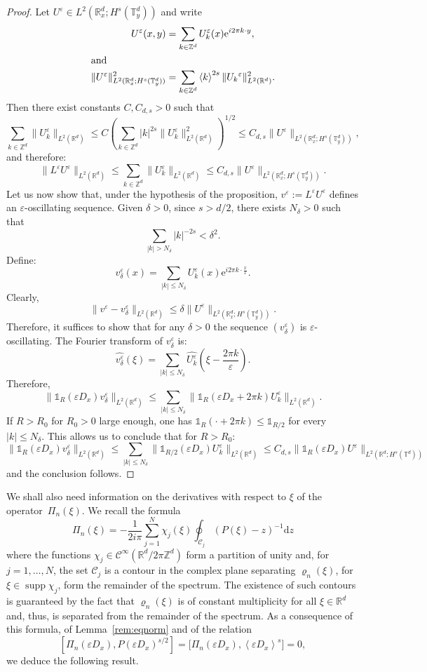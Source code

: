 \documentclass[AHL,Unicode,longabstracts]{cedram}
\DeclareMathOperator{\supp}{supp}
\newcommand*\R{{\mathbb R}}
\newcommand*\Z{{\mathbb Z}}
\newcommand*\T{{\mathbb T}}
\newcommand*\eps{\varepsilon}
\numberwithin{equation}{section}
\newcommand{\ee}{{\mathrm e}}
\newcommand*{\dd}{\mathrm{d}}
\begin{document}
\begin{proof}
Let $U^\eps \in L^2(\R^d_x;H^s(\T^d_y))$ and write
\begin{align*}
U^\eps(x,y)&=\sum_{k\in\Z^d}U_k^\eps(x){\ee}^{i2\pi k\cdot y},\\
\intertext{and}
\|U{^\eps}\|_{L^2(\R^d_x;H^s(\T^d_y))}^2 &=\sum_{k\in\Z^d}\left\langle k \right\rangle^{{2s}} \|U_k{^\eps}\|^2_{L^2(\R^d)}.
\end{align*}
Then there exist constants $C,C_{d,s}>0$ such that
\[
\sum_{k\in\Z^d}\|U_k^\eps\|_{L^2(\R^d)}\leq C\left(\sum_{k\in\Z^d}|k|^{2s} \|U_k^\eps\|_{L^2(\R^d)}^2\right)^{1/2} \leq C_{d,s} \|U^\eps\|_{L^2(\R^d_x;H^s(\T^d_y))},
\]
and therefore:
\begin{equation}\label{eq:bdVe}
\|L^\eps U^\eps\|_{L^2(\R^d)}\leq \sum_{k\in\Z^d}\|U_k^\eps\|_{L^2(\R^d)}\leq C_{d,s}\|U^\eps\|_{L^2(\R^d_x;H^s(\T^d_y))}.
\end{equation}
Let us now show that, under the hypothesis of the proposition, $v^\eps:=L^\eps U^\eps$ defines an $\eps$-oscillating sequence. Given $\delta>0$, since $s>d/2$, there exists $N_\delta>0$ such that
\[
\sum_{|k|>N_\delta}|k|^{-2s}<\delta^2.
\]
Define:
\[
v^\eps_\delta(x)=\sum_{|k|\leq N_\delta}U_k^\eps(x){\ee}^{i2\pi k\cdot \frac{x}{\eps}}.
\]
Clearly,
\[
\|v^\eps-v^\eps_\delta\|_{L^2(\R^d)}\leq \delta \|U^\eps\|_{L^2(\R^d_x;H^s(\T^d_y))}.
\]
Therefore, it suffices to show that for any $\delta>0$ the sequence $(v^\eps_\delta)$ is $\eps$-oscillating. The Fourier transform of $v^\eps_\delta$ is:
\[
\widehat{v^\eps_\delta}(\xi)=\sum_{|k|\leq N_\delta}\widehat{U_k^\eps}\left(\xi -\frac{2\pi k}{\eps}\right).
\]
Therefore,
\[
\|\mathds{1}_R(\eps D_x)v^\eps_{\delta}\|_{L^2(\R^d)}\leq \sum_{|k|\leq N_\delta}\|\mathds{1}_R(\eps D_x+2\pi k)U_k^\eps\|_{L^2(\R^d)}.
\]
If $R>R_0$ for $R_0>0$ large enough, one has $\mathds{1}_R(\cdot+2\pi k)\leq \mathds{1}_{R/2}$ for every $|k|\leq N_{\delta}$. This allows us to conclude that for $R>R_0$:
\[
\|\mathds{1}_R(\eps D_x)v^\eps_\delta\|_{L^2(\R^d)}\leq \sum_{|k|\leq N_\delta}\|\mathds{1}_{R/2}(\eps D_x)U_k^\eps\|_{L^2(\R^d)}\leq C_{d,s}\|\mathds{1}_R(\eps D_x)U^\eps\|_{L^2(\R^d;H^s(\T^d))}
\]
and the conclusion follows.
\end{proof}



We shall also need information on the derivatives with respect to $\xi$ of the operator~$\Pi_n(\xi)$. We recall the formula
\[
\Pi_n(\xi) =- \frac{1}{2i\pi} \sum_{j=1}^N\chi_j(\xi)\oint_{\mathcal C_j} (P(\xi)-z)^{-1} \dd z
\]
where the functions $\chi_j\in\mathcal{C}^\infty(\R^d/2\pi\Z^d)$ form a partition of unity and, for $j=1,\dots,N$, the set ${\mathcal C_j}$ is a contour in the complex plane separating $\varrho_n(\xi)$, for $\xi\in{\supp}\chi_j$, form the remainder of the spectrum. The existence of such contours is guaranteed by the fact that $\varrho_n(\xi)$ is of constant multiplicity for all $\xi\in\R^d$ and, thus, is separated from the remainder of the spectrum. As a consequence of this formula, of Lemma~\ref{rem:eqnorm} and of the relation
\[
\left[\Pi_n(\eps D_x),P(\eps D_x)^{s/2}\right]=\big[\Pi_n(\eps D_x),\left\langle \eps D_x\right\rangle^s\big]=0,
\]
we deduce the following result.
\end{document}

